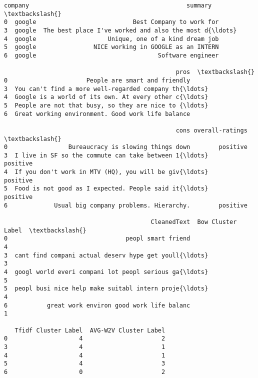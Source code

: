 \documentclass[11pt]{article}
\makeatletter
\newcommand{\boxspacing}{\kern\kvtcb@left@rule\kern\kvtcb@boxsep}
\newcommand{\prompt}[4]{
        \ttfamily\llap{{\color{#2}[#3]:\hspace{3pt}#4}}\vspace{-\baselineskip}
    }
\makeatother
\begin{document}
            \begin{tcolorbox}[breakable, size=fbox, boxrule=.5pt, pad at break*=1mm, opacityfill=0]
\prompt{Out}{outcolor}{288}{\boxspacing}
\begin{Verbatim}[commandchars=\\\{\}]
  company                                            summary  \textbackslash{}
0  google                           Best Company to work for
3  google  The best place I've worked and also the most d{\ldots}
4  google                    Unique, one of a kind dream job
5  google                NICE working in GOOGLE as an INTERN
6  google                                  Software engineer

                                                pros  \textbackslash{}
0                      People are smart and friendly
3  You can't find a more well-regarded company th{\ldots}
4  Google is a world of its own. At every other c{\ldots}
5  People are not that busy, so they are nice to {\ldots}
6  Great working environment. Good work life balance

                                                cons overall-ratings  \textbackslash{}
0                 Bureaucracy is slowing things down        positive
3  I live in SF so the commute can take between 1{\ldots}        positive
4  If you don't work in MTV (HQ), you will be giv{\ldots}        positive
5  Food is not good as I expected. People said it{\ldots}        positive
6             Usual big company problems. Hierarchy.        positive

                                         CleanedText  Bow Cluster Label  \textbackslash{}
0                                 peopl smart friend                  4
3  cant find compani actual deserv hype get youll{\ldots}                  3
4  googl world everi compani lot peopl serious ga{\ldots}                  5
5  peopl busi nice help make suitabl intern proje{\ldots}                  4
6           great work environ good work life balanc                  1

   Tfidf Cluster Label  AVG-W2V Cluster Label
0                    4                      2
3                    4                      1
4                    4                      1
5                    4                      3
6                    0                      2
\end{Verbatim}
\end{tcolorbox}
        
\end{document}

